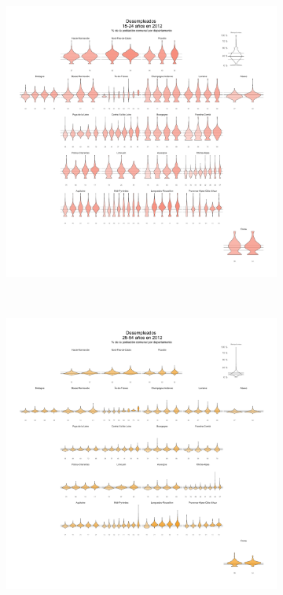 \begin{figure}[H]
	\centering
	\begin{subfigure}{0.3\textwidth}
	\includegraphics[width = \textwidth]{Figs/AED/Geofacet_Distr_por_Dpto_Des1_2012}
	\end{subfigure}
	~
	\begin{subfigure}{0.3\textwidth}
	\includegraphics[width = \textwidth]{Figs/AED/Geofacet_Distr_por_Dpto_Des2_2012}

\end{subfigure}
\end{figure}
